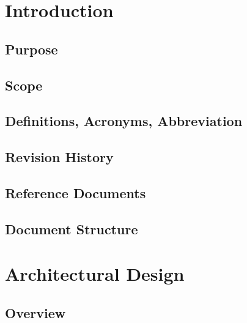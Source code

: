 \documentclass[10pt,openany]{book}
\begin{document}
\chapter{Introduction}

	\section{Purpose}

		

	\section{Scope}

		

	\section{Definitions, Acronyms, Abbreviation}

		

	\section{Revision History}

		

	\section{Reference Documents}

		

	\section{Document Structure}

		

\chapter{Architectural Design}\label{chapt:sum}

	\section{Overview}
\end{document}
